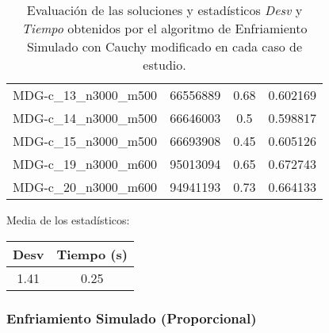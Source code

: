 \documentclass{article}
\begin{document}
\begin{table}[H]
\begin{tabular}{|cccc|}
		MDG-c\_13\_n3000\_m500 & 66556889 & 0.68 & 0.602169\\
		MDG-c\_14\_n3000\_m500 & 66646003 & 0.5 & 0.598817\\
		MDG-c\_15\_n3000\_m500 & 66693908 & 0.45 & 0.605126\\
		MDG-c\_19\_n3000\_m600 & 95013094 & 0.65 & 0.672743\\
		MDG-c\_20\_n3000\_m600 & 94941193 & 0.73 & 0.664133\\
		\hline
	\end{tabular}
	\caption{Evaluación de las soluciones y estadísticos \emph{Desv} y \emph{Tiempo} obtenidos por el algoritmo de Enfriamiento Simulado con Cauchy modificado en cada caso de estudio.}
	\label{tab:es}
\end{table}

Media de los estadísticos:
\begin{table}[H]
	\centering
	\begin{tabular}{|cc|}
		\hline
		Desv & Tiempo (s)\\ \hline
		 1.41 & 0.25 \\
		\hline
	\end{tabular}
\end{table}

\pagebreak

\subsubsection*{Enfriamiento Simulado (Proporcional)}
\end{document}
